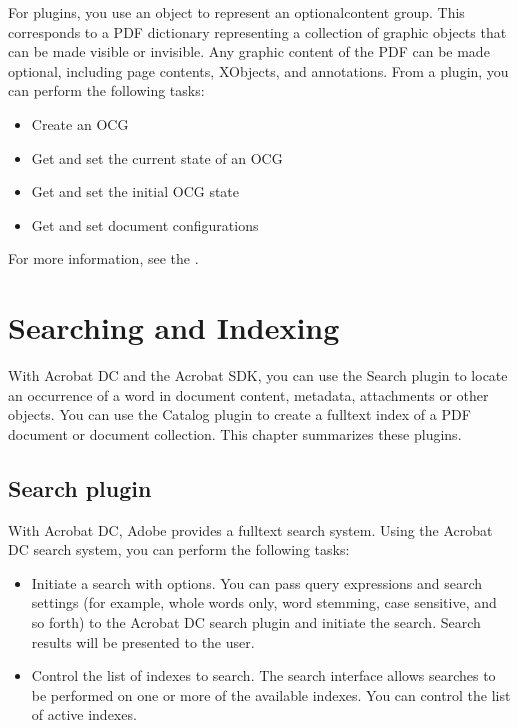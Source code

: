 \documentclass[letterpaper,12pt,english,openany,oneside]{sphinxmanual}
\begin{document}
For plug\sphinxhyphen{}ins, you use an object to represent an optional\sphinxhyphen{}content group. This corresponds to a PDF dictionary representing a collection of graphic objects that can be made visible or invisible. Any graphic content of the PDF can be made optional, including page contents, XObjects, and annotations. From a plug\sphinxhyphen{}in, you can perform the following tasks:
\begin{itemize}
\item {} 
Create an OCG

\item {} 
Get and set the current state of an OCG

\item {} 
Get and set the initial OCG state

\item {} 
Get and set document configurations

\end{itemize}

For more information, see the  .


\chapter{Searching and Indexing}
\label{\detokenize{Overview_Searching:searching-and-indexing}}\label{\detokenize{Overview_Searching::doc}}
With Acrobat DC and the Acrobat SDK, you can use the Search plug\sphinxhyphen{}in to locate an occurrence of a word in document content, metadata, attachments or other objects. You can use the Catalog plug\sphinxhyphen{}in to create a full\sphinxhyphen{}text index of a PDF document or document collection. This chapter summarizes these plug\sphinxhyphen{}ins.




\section{Search plug\sphinxhyphen{}in}
\label{\detokenize{Overview_Searching:search-plug-in}}
With Acrobat DC, Adobe provides a full\sphinxhyphen{}text search system. Using the Acrobat DC search system, you can perform the following tasks:
\begin{itemize}
\item {} 
Initiate a search with options. You can pass query expressions and search settings (for example, whole words only, word stemming, case sensitive, and so forth) to the Acrobat DC search plug\sphinxhyphen{}in and initiate the search. Search results will be presented to the user.

\item {} 
Control the list of indexes to search. The search interface allows searches to be performed on one or more of the available indexes. You can control the list of active indexes.

\end{itemize}
\end{document}
